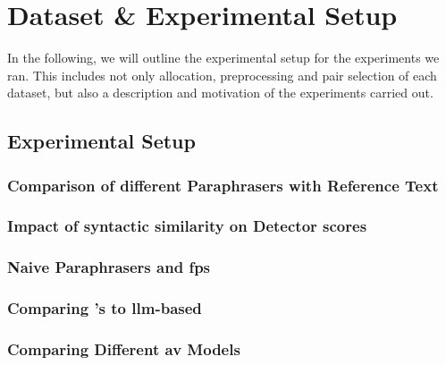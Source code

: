 \chapter{Dataset \& Experimental Setup}
\label{chap:dataset_experimental_setup}

In the following, we will outline the experimental setup for the experiments we ran.
This includes not only allocation, preprocessing and pair selection of each dataset, but also a description and motivation of the experiments carried out.




\section{Experimental Setup}
\label{sec:experimental_setup}





\subsection{Comparison of different Paraphrasers with Reference Text}

\subsection{Impact of syntactic similarity on \imp{} Detector scores}
\label{sec:syn_sim_impact_}

\subsection{Naive Paraphrasers and \acp{fp}}

\subsection{Comparing \citet{koppel_determining_2014}'s to \ac{llm}-based \imps{}}

\subsection{Comparing Different \ac{av} Models}





